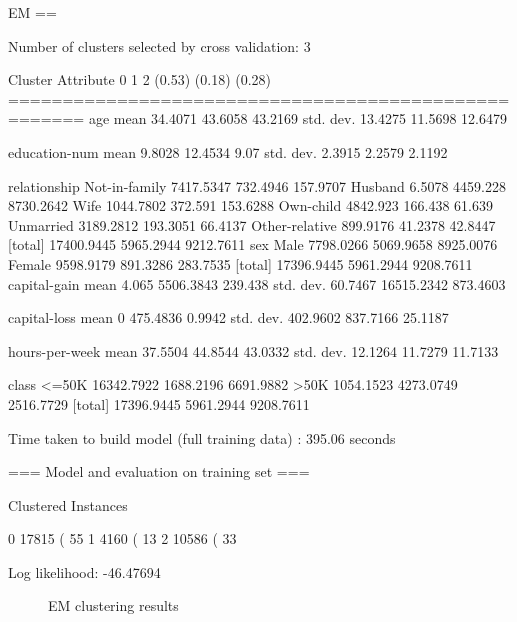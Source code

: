 \documentclass{sig-alternate}
\begin{document}
\scriptsize
\begin{verbbox}
EM
==

Number of clusters selected by cross validation: 3


                     Cluster
Attribute                  0           1           2
                      (0.53)      (0.18)      (0.28)
=====================================================
age
  mean                34.4071     43.6058     43.2169
  std. dev.           13.4275     11.5698     12.6479

education-num
  mean                 9.8028     12.4534        9.07
  std. dev.            2.3915      2.2579      2.1192

relationship
   Not-in-family    7417.5347    732.4946    157.9707
   Husband             6.5078    4459.228   8730.2642
   Wife             1044.7802     372.591    153.6288
   Own-child         4842.923     166.438      61.639
   Unmarried        3189.2812    193.3051     66.4137
   Other-relative    899.9176     41.2378     42.8447
  [total]          17400.9445   5965.2944   9212.7611
sex
   Male             7798.0266   5069.9658   8925.0076
   Female           9598.9179    891.3286    283.7535
  [total]          17396.9445   5961.2944   9208.7611
capital-gain
  mean                  4.065   5506.3843     239.438
  std. dev.           60.7467  16515.2342    873.4603

capital-loss
  mean                      0    475.4836      0.9942
  std. dev.          402.9602    837.7166     25.1187

hours-per-week
  mean                37.5504     44.8544     43.0332
  std. dev.           12.1264     11.7279     11.7133

class
   <=50K           16342.7922   1688.2196   6691.9882
   >50K             1054.1523   4273.0749   2516.7729
  [total]          17396.9445   5961.2944   9208.7611


Time taken to build model (full training data) : 395.06 seconds

=== Model and evaluation on training set ===

Clustered Instances

0      17815 ( 55%
1       4160 ( 13%
2      10586 ( 33%

Log likelihood: -46.47694
\end{verbbox}
\normalsize

\begin{figure}[!htbp]
    \centering
    \theverbbox
    \caption{EM clustering results\label{em-summary}}
\end{figure}
\end{document}
